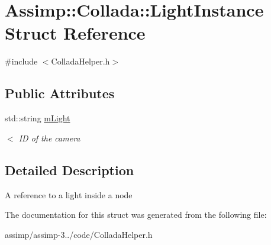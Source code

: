 \hypertarget{struct_assimp_1_1_collada_1_1_light_instance}{\section{Assimp\+:\+:Collada\+:\+:Light\+Instance Struct Reference}
\label{struct_assimp_1_1_collada_1_1_light_instance}
}


{\ttfamily \#include $<$Collada\+Helper.\+h$>$}

\subsection*{Public Attributes}
\begin{DoxyCompactItemize}
\item 
\hypertarget{struct_assimp_1_1_collada_1_1_light_instance_a78cd191fa703875efad445c8ed53119c}{std\+::string \hyperlink{struct_assimp_1_1_collada_1_1_light_instance_a78cd191fa703875efad445c8ed53119c}{m\+Light}}\label{struct_assimp_1_1_collada_1_1_light_instance_a78cd191fa703875efad445c8ed53119c}

\begin{DoxyCompactList}\small\item\em $<$ I\+D of the camera \end{DoxyCompactList}\end{DoxyCompactItemize}


\subsection{Detailed Description}
A reference to a light inside a node 

The documentation for this struct was generated from the following file\+:\begin{DoxyCompactItemize}
\item 
assimp/assimp-\/3../code/Collada\+Helper.\+h\end{DoxyCompactItemize}
